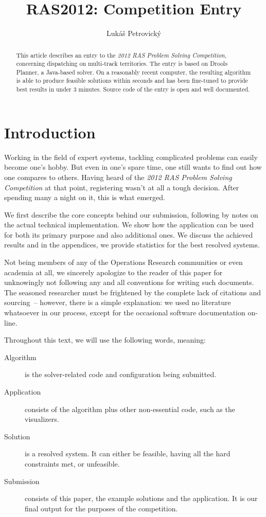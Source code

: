 \documentclass[10pt,a4paper,final]{article}
\author{Lukáš Petrovický}
\title{RAS2012: Competition Entry}
\begin{document}
\maketitle

\begin{abstract}
This article describes an entry to the \emph{2012 RAS Problem Solving Competition}, concerning dispatching on multi-track territories. The entry is based on Drools Planner, a Java-based solver. On a reasonably recent computer, the resulting algorithm is able to produce feasible solutions within seconds and has been fine-tuned to provide best results in under 3 minutes. Source code of the entry is open and well documented.
\end{abstract}

\section{Introduction}

Working in the field of expert systems, tackling complicated problems can easily become one's hobby. But even in one's spare time, one still wants to find out how one compares to others. Having heard of the \emph{2012 RAS Problem Solving Competition} at that point, registering wasn't at all a tough decision. After spending many a night on it, this is what emerged.

We first describe the core concepts behind our submission, following by notes on the actual technical implementation. We show how the application can be used for both its primary purpose and also additional ones. We discuss the achieved results and in the appendices, we provide statistics for the best resolved systems.

Not being members of any of the Operations Research communities or even academia at all, we sincerely apologize to the reader of this paper for unknowingly not following any and all conventions for writing such documents. The seasoned researcher must be frightened by the complete lack of citations and sourcing~-- however, there is a simple explanation: we used no literature whatsoever in our process, except for the occasional software documentation on-line.

Throughout this text, we will use the following words, meaning:

\begin{description}
\item[Algorithm] is the solver-related code and configuration being submitted.
\item[Application] consists of the algorithm plus other non-essential code, such as the visualizers.
\item[Solution] is a resolved system. It can either be feasible, having all the hard constraints met, or unfeasible.
\item[Submission] consists of this paper, the example solutions and the application. It is our final output for the purposes of the competition.
\end{description}
\end{document}
